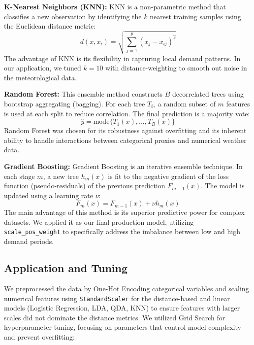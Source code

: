 \documentclass{article}
\begin{document}
\textbf{K-Nearest Neighbors (KNN):} KNN is a non-parametric method that classifies a new observation by identifying the $k$ nearest training samples using the Euclidean distance metric:
\begin{equation}
    d(x, x_i) = \sqrt{\sum_{j=1}^{p} (x_j - x_{ij})^2}
\end{equation}
The advantage of KNN is its flexibility in capturing local demand patterns. In our application, we tuned $k=10$ with distance-weighting to smooth out noise in the meteorological data.

\textbf{Random Forest:} This ensemble method constructs $B$ decorrelated trees using bootstrap aggregating (bagging). For each tree $T_b$, a random subset of $m$ features is used at each split to reduce correlation. The final prediction is a majority vote: 
\begin{equation}
\hat{y} = \text{mode} \{ T_1(x), ..., T_B(x) \}
\end{equation}
Random Forest was chosen for its robustness against overfitting and its inherent ability to handle interactions between categorical proxies and numerical weather data.

\textbf{Gradient Boosting:} Gradient Boosting \cite{xgboost} is an iterative ensemble technique. In each stage $m$, a new tree $h_m(x)$ is fit to the negative gradient of the loss function (pseudo-residuals) of the previous prediction $F_{m-1}(x)$. The model is updated using a learning rate $\nu$: 
\begin{equation}
F_m(x) = F_{m-1}(x) + \nu h_m(x)
\end{equation}
The main advantage of this method is its superior predictive power for complex datasets. We applied it as our final production model, utilizing \texttt{scale\_pos\_weight} to specifically address the imbalance between low and high demand periods.

\subsection{Application and Tuning}

We preprocessed the data by One-Hot Encoding categorical variables and scaling numerical features using \texttt{StandardScaler} for the distance-based and linear models (Logistic Regression, LDA, QDA, KNN) to ensure features with larger scales did not dominate the distance metrics. We utilized Grid Search for hyperparameter tuning, focusing on parameters that control model complexity and prevent overfitting:
\end{document}
